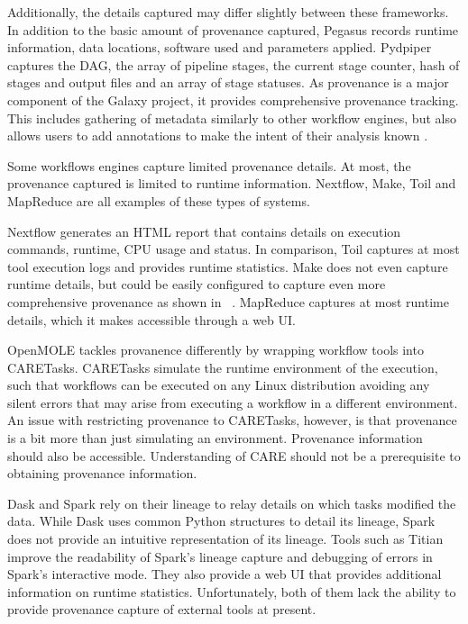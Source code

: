 \documentclass{report}
\begin{document}
            Additionally, the details captured may differ slightly between 
            these frameworks. In addition to the basic amount of  provenance 
            captured, Pegasus records runtime information, data locations, 
            software used and parameters applied. Pydpiper captures the DAG, the 
            array of pipeline stages, the current stage counter, hash of stages 
            and output files and an array of stage statuses. As provenance is a 
            major component of the Galaxy project, it 
            provides comprehensive provenance tracking. This includes gathering
            of metadata similarly to other workflow engines, but also allows
            users to add annotations to make the intent of their analysis known
            .

            Some workflows engines capture limited provenance details. At 
            most, the provenance captured is limited to runtime information.
            Nextflow, Make, Toil and MapReduce are all examples of these types
            of systems.

            Nextflow generates an
            HTML report that contains details on execution commands, runtime, 
            CPU usage and status. In comparison, Toil captures at most tool 
            execution logs and provides runtime 
            statistics. Make does not even capture runtime details, but could be
            easily configured to capture even more comprehensive provenance as
            shown in ~\cite{10.3389/fninf.2016.00002}. MapReduce captures at 
            most runtime details, which it makes accessible through a web UI.

            OpenMOLE tackles provanence differently by wrapping workflow tools
            into CARETasks. CARETasks simulate the runtime environment of the 
            execution, such that workflows can be executed on any Linux 
            distribution avoiding any silent errors that may arise from 
            executing a workflow in a different environment. An issue with 
            restricting provenance to CARETasks, however, is that provenance is
            a bit more than just simulating an environment. Provenance 
            information should also be accessible. Understanding of CARE should
            not be a prerequisite to obtaining provenance information.
                     
            Dask and Spark rely on their lineage to relay details on which 
            tasks modified the data. While Dask uses common Python structures to 
            detail its lineage, Spark does not provide an intuitive 
            representation of its lineage. Tools such as 
            Titian~\cite{interlandi2018adding} improve the readability of 
            Spark's lineage capture and  debugging of errors in 
            Spark's interactive mode. They also provide a web UI that provides
            additional information on runtime statistics. Unfortunately, both
            of them lack the ability to provide provenance capture of external
            tools at present.
\end{document}
